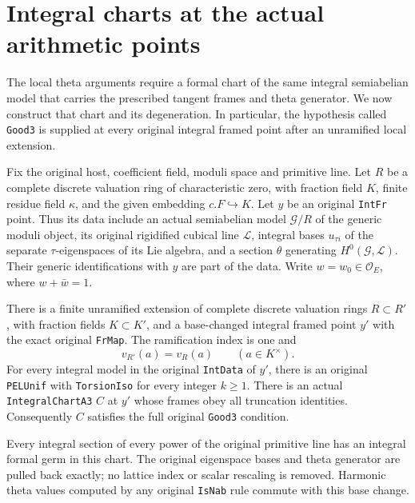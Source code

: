 \section{Integral charts at the actual arithmetic points}
\label{sec:actual-good3}

The local theta arguments require a formal chart of the same integral
semiabelian model that carries the prescribed tangent frames and theta
generator.  We now construct that chart and its degeneration.  In
particular, the hypothesis called \texttt{Good3} is supplied at every
original integral framed point after an unramified local extension.

Fix the original host, coefficient field, moduli space and primitive
line.  Let $R$ be a complete discrete valuation ring of characteristic
zero, with fraction field $K$, finite residue field $\kappa$, and the
given embedding $c.F\hookrightarrow K$.  Let $y$ be an original
\texttt{IntFr} point.  Thus its data include an actual semiabelian
model $\mathcal G/R$ of the generic moduli object, its original
rigidified cubical line $\mathscr L$, integral bases
$u_{\tau i}$ of the separate $\tau$-eigenspaces of its Lie algebra,
and a section $\theta$ generating $H^0(\mathcal G,\mathscr L)$.
Their generic identifications with $y$ are part of the data.
Write $w=w_0\in\mathcal O_E$, where $w+\bar w=1$.

\begin{theorem}
\label{thm:actual-good3}
There is a finite unramified extension of complete discrete valuation
rings $R\subset R'$, with fraction fields $K\subset K'$, and a
base-changed integral framed point $y'$ with the exact original
\texttt{FrMap}.  The ramification index is one and
\[
                      v_{R'}(a)=v_R(a)\qquad(a\in K^\times).
\]
For every integral model in the original \texttt{IntData} of $y'$,
there is an original \texttt{PELUnif} with \texttt{TorsionIso} for
every integer $k\geq1$.  There is an actual
\texttt{IntegralChartA3} $C$ at $y'$ whose frames obey all truncation
identities.  Consequently $C$ satisfies the full original
\texttt{Good3} condition.

Every integral section of every power of the original primitive line
has an integral formal germ in this chart.  The original eigenspace
bases and theta generator are pulled back exactly; no lattice index
or scalar rescaling is removed.  Harmonic theta values computed by
any original \texttt{IsNab} rule commute with this base change.
\end{theorem}

